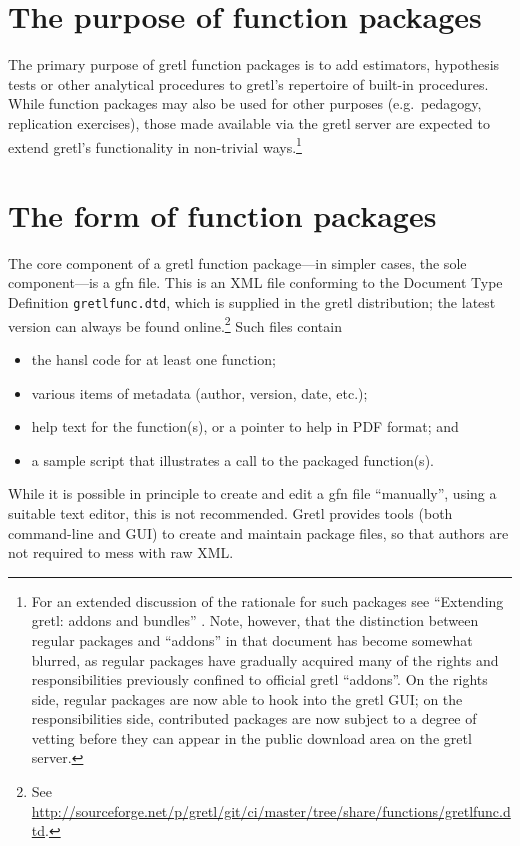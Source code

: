 \documentclass[oneside]{book}
\begin{document}
\section{The purpose of function packages}
\label{sec:purpose}

The primary purpose of gretl function packages is to add estimators,
hypothesis tests or other analytical procedures to gretl's repertoire
of built-in procedures. While function packages may also be used for
other purposes (e.g.\ pedagogy, replication exercises), those made
available via the gretl server are expected to extend gretl's
functionality in non-trivial ways.\footnote{For an extended discussion
  of the rationale for such packages see ``Extending gretl: addons and
  bundles'' \citep{addons-bundles}. Note, however, that the
  distinction between regular packages and ``addons'' in that document
  has become somewhat blurred, as regular packages have gradually
  acquired many of the rights and responsibilities previously confined
  to official gretl ``addons''. On the rights side, regular packages
  are now able to hook into the gretl GUI; on the responsibilities
  side, contributed packages are now subject to a degree of vetting
  before they can appear in the public download area on the gretl
  server.}

\section{The form of function packages}
\label{sec:pkgform}

The core component of a gretl function package---in simpler cases,
the sole component---is a \textsf{gfn} file. This is an XML file
conforming to the Document Type Definition \texttt{gretlfunc.dtd},
which is supplied in the gretl distribution; the latest version can
always be found online.\footnote{See
  \url{http://sourceforge.net/p/gretl/git/ci/master/tree/share/functions/gretlfunc.dtd}.}
Such files contain
\begin{itemize}
\item the hansl code for at least one function;
\item various items of metadata (author, version, date, etc.);
\item help text for the function(s), or a pointer to help in
  PDF format; and
\item a sample script that illustrates a call to the packaged
  function(s).
\end{itemize}

While it is possible in principle to create and edit a \textsf{gfn}
file ``manually'', using a suitable text editor, this is not
recommended. Gretl provides tools (both command-line and GUI) to create
and maintain package files, so that authors are not required to
mess with raw XML.
\end{document}
